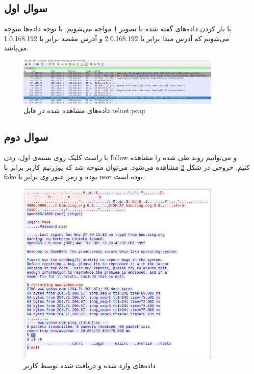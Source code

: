 \documentclass{article}
\begin{document}
\subsection{سوال اول}
با باز کردن داده‌های گفته شده با تصویر \ref{fig:teldata} مواجه می‌شویم. با توجه داده‌ها متوجه می‌شویم که آدرس مبدا برابر با 
2.0.168.192 
و آدرس مقصد برابر با
1.0.168.192 
می‌باشد.
\begin{figure}[h!]
	\centering
	\includegraphics[width=0.9\textwidth]{src/teldata.png}
	\caption{
		داده‌های مشاهده شده در فایل telnet.pcap
	}
	\label{fig:teldata}
\end{figure}
\subsection{سوال دوم}
با راست کلیک روی بسته‌ی اول، زدن follow و 
می‌توانیم روند طی شده را مشاهده کنیم. خروجی در شکل \ref{fig:teldetail} مشاهده می‌شود. می‌توان متوجه شد که یوزرنیم کاربر برابر با fake بوده و رمز عبور وی برابر با user بوده است.
\begin{figure}[h!]
	\centering
	\includegraphics[width=0.9\textwidth]{src/teldetail.png}
	\caption{
		داده‌های وارد شده و دریافت شده توسط کاربر
	}
	\label{fig:teldetail}
\end{figure}
\end{document}

